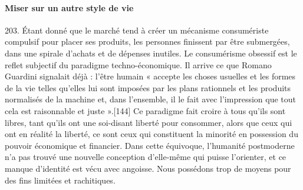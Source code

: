 \paragraph{Miser sur un autre style de vie}
\begin{singlequote}
        203. Étant donné que le marché tend à créer un mécanisme consumériste compulsif pour placer ses produits, les personnes finissent par être submergées, dans une spirale d’achats et de dépenses inutiles. Le consumérisme obsessif est le reflet subjectif du paradigme techno-économique. Il arrive ce que Romano Guardini signalait déjà : l’être humain « accepte les choses usuelles et les formes de la vie telles qu’elles lui sont imposées par les plans rationnels et les produits normalisés de la machine et, dans l’ensemble, il le fait avec l’impression que tout cela est raisonnable et juste ».[144] Ce paradigme fait croire à tous qu’ils sont libres, tant qu’ils ont une soi-disant liberté pour consommer, alors que ceux qui ont en réalité la liberté, ce sont ceux qui constituent la minorité en possession du pouvoir économique et financier. Dans cette équivoque, l’humanité postmoderne n’a pas trouvé une nouvelle conception d’elle-même qui puisse l’orienter, et ce manque d’identité est vécu avec angoisse. Nous possédons trop de moyens pour des fins limitées et rachitiques.

\end{singlequote}

        
